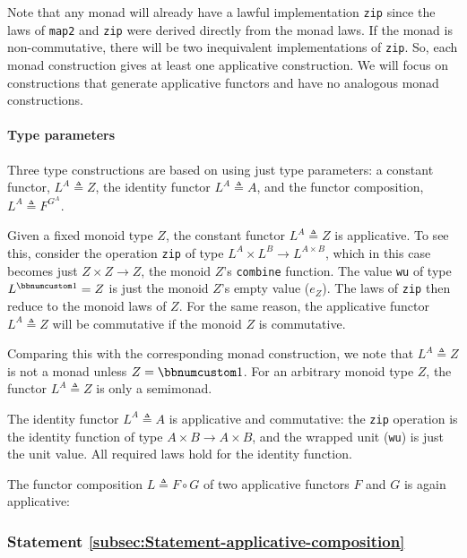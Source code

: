 Note that any monad will already have a lawful implementation \lstinline!zip!
since the laws of \lstinline!map2! and \lstinline!zip! were derived
directly from the monad laws. If the monad is non-commutative, there
will be two inequivalent implementations of \lstinline!zip!. So,
each monad construction gives at least one applicative construction.
We will focus on constructions that generate applicative functors
and have no analogous monad constructions.

\paragraph{Type parameters}

Three type constructions are based on using just type parameters:
a constant functor, $L^{A}\triangleq Z$, the identity functor $L^{A}\triangleq A$,
and the functor composition, $L^{A}\triangleq F^{G^{A}}$.

Given a fixed monoid type $Z$, the constant functor $L^{A}\triangleq Z$
is applicative. To see this, consider the operation \lstinline!zip!
of type $L^{A}\times L^{B}\rightarrow L^{A\times B}$, which in this
case becomes just $Z\times Z\rightarrow Z$, the monoid $Z$\textsf{'}s \lstinline!combine!
function. The value \lstinline!wu! of type $L^{\bbnum 1}=Z$ is just
the monoid $Z$\textsf{'}s empty value ($e_{Z}$). The laws of \lstinline!zip!
then reduce to the monoid laws of $Z$. For the same reason, the applicative
functor $L^{A}\triangleq Z$ will be commutative if the monoid $Z$
is commutative.

Comparing this with the corresponding monad construction, we note
that $L^{A}\triangleq Z$ is not a monad unless $Z=\bbnum 1$. For
an arbitrary monoid type $Z$, the functor $L^{A}\triangleq Z$ is
only a semimonad.

The identity functor $L^{A}\triangleq A$ is applicative and commutative:
the \lstinline!zip! operation is the identity function of type $A\times B\rightarrow A\times B$,
and the wrapped unit (\lstinline!wu!) is just the unit value. All
required laws hold for the identity function.

The functor composition $L\triangleq F\circ G$ of two applicative
functors $F$ and $G$ is again applicative:

\subsubsection{Statement \label{subsec:Statement-applicative-composition}\ref{subsec:Statement-applicative-composition}}

